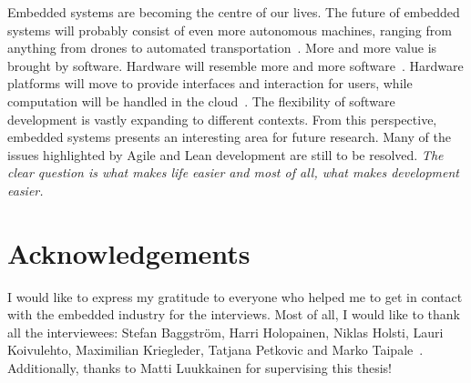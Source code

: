 \documentclass[english]{tktltiki2}
\begin{document}
Embedded systems are becoming the centre of our lives. The future of embedded systems will probably consist of even more autonomous machines, ranging from anything from drones to automated transportation~\cite{Kri15}. More and more value is brought by software. Hardware will resemble more and more software~\cite{Hol15a}. Hardware platforms will move to provide interfaces and interaction for users, while computation will be handled in the cloud~\cite{BT15}. The flexibility of software development is vastly expanding to different contexts. From this perspective, embedded systems presents an interesting area for future research. Many of the issues highlighted by Agile and Lean development are still to be resolved. \emph{The clear question is what makes life easier and most of all, what makes development easier.}


\section{Acknowledgements}

I would like to express my gratitude to everyone who helped me to get in contact with the embedded industry for the interviews. Most of all, I would like to thank all the interviewees: Stefan Baggström, Harri Holopainen, Niklas Holsti, Lauri Koivulehto, Maximilian Kriegleder, Tatjana Petkovic and Marko Taipale~\cite{BT15, Hol15a, Hol15b, Koi15, Kri15, Pet15}. Additionally, thanks to Matti Luukkainen for supervising this thesis!




\end{document}
